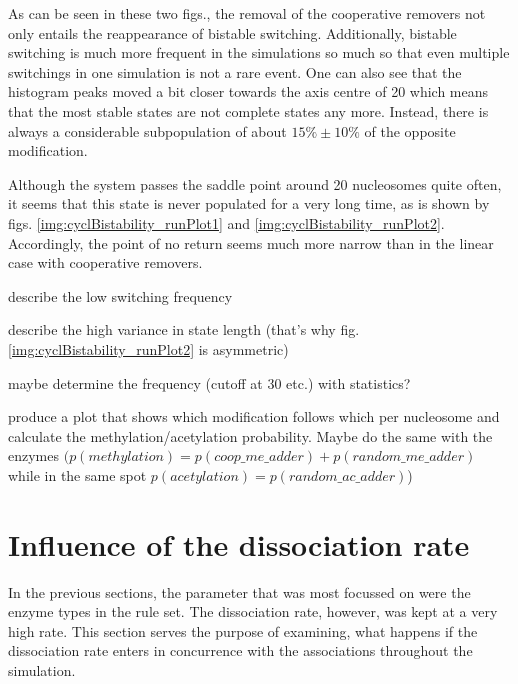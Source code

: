         As can be seen in these two figs., the removal of the cooperative removers not only entails the reappearance of bistable switching. Additionally, bistable switching is much more frequent in the simulations so much so that even multiple switchings in one simulation is not a rare event. One can also see that the histogram peaks moved a bit closer towards the axis centre of 20 which means that the most stable states are not complete states any more. Instead, there is always a considerable subpopulation of about $15\% \pm 10\%$ of the opposite modification.

        Although the system passes the saddle point around 20 nucleosomes quite often, it seems that this state is never populated for a very long time, as is shown by figs. \ref{img:cyclBistability_runPlot1} and \ref{img:cyclBistability_runPlot2}. Accordingly, the point of no return seems much more narrow than in the linear case with cooperative removers.

        \begin{itemize}
            {
                \color{red}
                \item describe the low switching frequency
                \item describe the high variance in state length (that's why fig. \ref{img:cyclBistability_runPlot2} is asymmetric)
                \item maybe determine the frequency (cutoff at 30 etc.) with statistics?
                \item produce a plot that shows which modification follows which per nucleosome and calculate the methylation/acetylation probability. Maybe do the same with the enzymes $(p(methylation)=p(coop\_me\_adder)+p(random\_me\_adder)$ while in the same spot $p(acetylation)=p(random\_ac\_adder)$)
            }
        \end{itemize}
    \newpage
    \section{Influence of the dissociation rate}
        \label{sec:ResInfluenceDissociationRate}

        In the previous sections, the parameter that was most focussed on were the enzyme types in the rule set. The dissociation rate, however, was kept at a very high rate. This section serves the purpose of examining, what happens if the dissociation rate enters in concurrence with the associations throughout the simulation.

